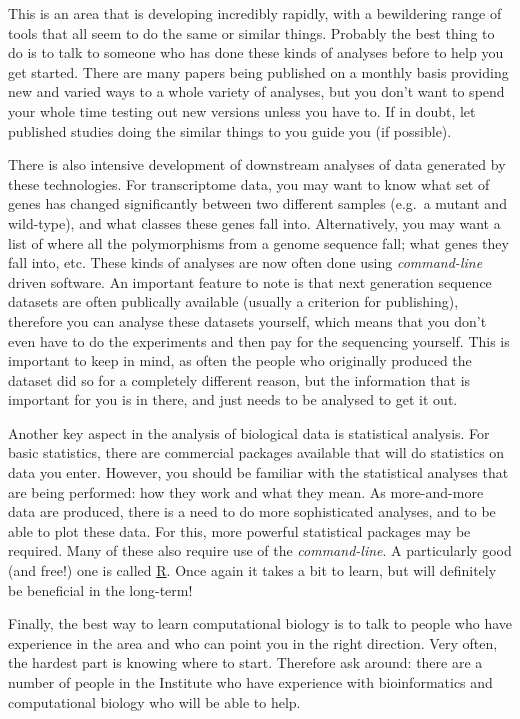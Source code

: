 \documentclass[]{article}
\begin{document}
This is an area that is developing incredibly rapidly, with a
bewildering range of tools that all seem to do the same or similar
things. Probably the best thing to do is to talk to someone who has done
these kinds of analyses before to help you get started. There are many
papers being published on a monthly basis providing new and varied ways
to a whole variety of analyses, but you don't want to spend your whole
time testing out new versions unless you have to. If in doubt, let
published studies doing the similar things to you guide you (if
possible).

There is also intensive development of downstream analyses of data
generated by these technologies. For transcriptome data, you may want to
know what set of genes has changed significantly between two different
samples (e.g.~a mutant and wild-type), and what classes these genes fall
into. Alternatively, you may want a list of where all the polymorphisms
from a genome sequence fall; what genes they fall into, etc. These kinds
of analyses are now often done using \emph{command-line} driven
software. An important feature to note is that next generation sequence
datasets are often publically available (usually a criterion for
publishing), therefore you can analyse these datasets yourself, which
means that you don't even have to do the experiments and then pay for
the sequencing yourself. This is important to keep in mind, as often the
people who originally produced the dataset did so for a completely
different reason, but the information that is important for you is in
there, and just needs to be analysed to get it out.

Another key aspect in the analysis of biological data is statistical
analysis. For basic statistics, there are commercial packages available
that will do statistics on data you enter. However, you should be
familiar with the statistical analyses that are being performed: how
they work and what they mean. As more-and-more data are produced, there
is a need to do more sophisticated analyses, and to be able to plot
these data. For this, more powerful statistical packages may be
required. Many of these also require use of the \emph{command-line}. A
particularly good (and free!) one is called
\href{http://www.r-project.org/}{R}. Once again it takes a bit to learn,
but will definitely be beneficial in the long-term!

Finally, the best way to learn computational biology is to talk to
people who have experience in the area and who can point you in the
right direction. Very often, the hardest part is knowing where to start.
Therefore ask around: there are a number of people in the Institute who
have experience with bioinformatics and computational biology who will
be able to help.
\end{document}

